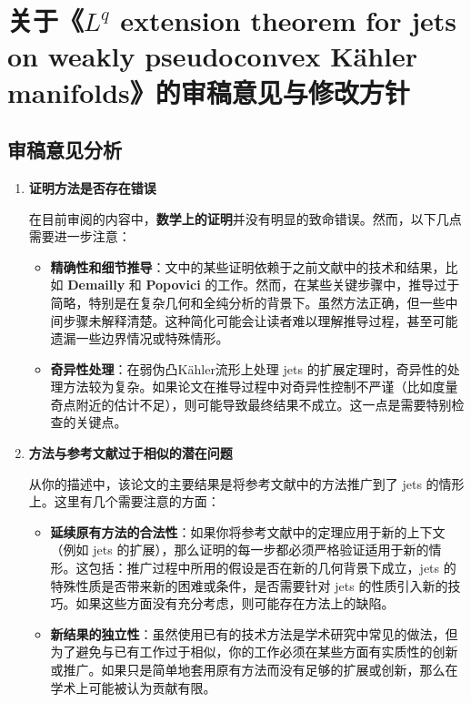 \documentclass[lang=cn,zihao=-4,twoside,fontset=none]{textbook}
\begin{document}
\chapter[关于第二篇论文的审稿意见与见解探讨]{关于《\texorpdfstring{$L^q$}{L^q} extension theorem for jets on weakly pseudoconvex K\"ahler manifolds》的审稿意见与修改方针}

\section{审稿意见分析}
\begin{enumerate}
    \item \textbf{证明方法是否存在错误}

    在目前审阅的内容中，\textbf{数学上的证明}并没有明显的致命错误。然而，以下几点需要进一步注意：

    \begin{itemize}
        \item \textbf{精确性和细节推导}：文中的某些证明依赖于之前文献中的技术和结果，比如 \textbf{Demailly} 和 \textbf{Popovici} 的工作。然而，在某些关键步骤中，推导过于简略，特别是在复杂几何和全纯分析的背景下。虽然方法正确，但一些中间步骤未解释清楚。这种简化可能会让读者难以理解推导过程，甚至可能遗漏一些边界情况或特殊情形。

        \item \textbf{奇异性处理}：在弱伪凸Kähler流形上处理 jets 的扩展定理时，奇异性的处理方法较为复杂。如果论文在推导过程中对奇异性控制不严谨（比如度量奇点附近的估计不足），则可能导致最终结果不成立。这一点是需要特别检查的关键点。
    \end{itemize}

    \item \textbf{方法与参考文献过于相似的潜在问题}

    从你的描述中，该论文的主要结果是将参考文献中的方法推广到了 jets 的情形上。这里有几个需要注意的方面：

    \begin{itemize}
        \item \textbf{延续原有方法的合法性}：如果你将参考文献中的定理应用于新的上下文（例如 jets 的扩展），那么证明的每一步都必须严格验证适用于新的情形。这包括：推广过程中所用的假设是否在新的几何背景下成立，jets 的特殊性质是否带来新的困难或条件，是否需要针对 jets 的性质引入新的技巧。如果这些方面没有充分考虑，则可能存在方法上的缺陷。

        \item \textbf{新结果的独立性}：虽然使用已有的技术方法是学术研究中常见的做法，但为了避免与已有工作过于相似，你的工作必须在某些方面有实质性的创新或推广。如果只是简单地套用原有方法而没有足够的扩展或创新，那么在学术上可能被认为贡献有限。
    \end{itemize}


\end{enumerate}
\end{document}
